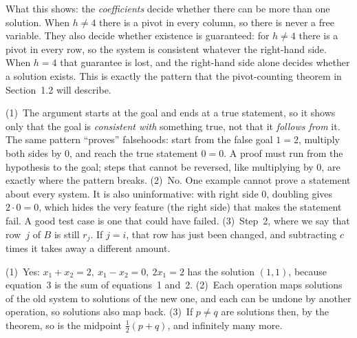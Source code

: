 \documentclass[11pt]{article}
\begin{document}
\begin{description}[leftmargin=0pt,itemsep=5pt]
        What this shows: the \emph{coefficients} decide whether there can be more than one solution.
        When $h\neq4$ there is a pivot in every column, so there is never a free variable. They
        also decide whether existence is guaranteed: for $h\neq4$ there is a pivot in every row, so the
        system is consistent whatever the right-hand side. When $h=4$ that guarantee is lost, and
        the right-hand side alone decides whether a solution exists. This is exactly the pattern
        that the pivot-counting theorem in Section~1.2 will describe.
  \item[Pause and think \ref{think:habits}.] (1)~The argument starts at the goal and ends at a true statement, so it shows only that the goal is \emph{consistent with} something true, not that it \emph{follows from} it. The same pattern ``proves'' falsehoods: start from the false goal $1=2$, multiply both sides by $0$, and reach the true statement $0=0$. A proof must run from the hypothesis to the goal; steps that cannot be reversed, like multiplying by $0$, are exactly where the pattern breaks. (2)~No. One example cannot prove a statement about every system. It is also uninformative: with right side $0$, doubling gives $2\cdot0=0$, which hides the very feature (the right side) that makes the statement fail. A good test case is one that could have failed. (3)~Step~2, where we say that row~$j$ of $B$ is still $r_j$. If $j=i$, that row has just been changed, and subtracting $c$ times it takes away a different amount.
  \item[Before the next section.] (1)~Yes: $x_1+x_2=2,\ x_1-x_2=0,\ 2x_1=2$ has the solution $(1,1)$,
        because equation~3 is the sum of equations~1 and~2. (2)~Each operation maps solutions of the old
        system to solutions of the new one, and each can be undone by another operation, so solutions
        also map back. (3)~If $p\neq q$ are solutions then, by the theorem, so is the midpoint
        $\tfrac12(p+q)$, and infinitely many more.
\end{description}
 
\end{document}
